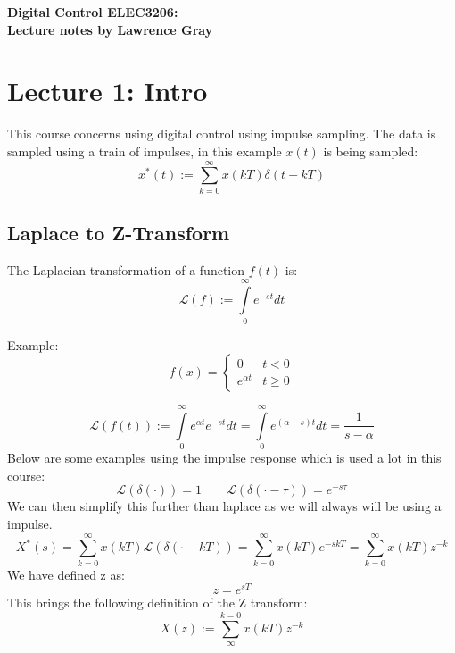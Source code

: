 \documentclass[a4paper,11pt]{article}
\begin{document}
  
\begin{center}

{\Large{\textbf{Digital Control ELEC3206:}}} \\ 
{\Large{\textbf{Lecture notes by Lawrence Gray}}} \\ [\baselineskip]
\end{center}
\section{Lecture 1: Intro }
	This course concerns using digital control using impulse sampling. The data is sampled using a train of impulses, in this example $x(t)$ is being sampled:
\begin{equation}
	x^*(t):= \sum\limits_{k=0}^{\infty}x(kT)\delta(t-kT)
	\end{equation}
	\subsection{Laplace to Z-Transform}
		The Laplacian transformation of a function $f(t)$ is:\\
		\begin{equation}
		\mathcal{L}(f):= \int\limits_{0}^{\infty}e^{-st}dt
		\end{equation}

		Example:\\
		
		\[ f(x) =\begin{cases} 
      			0 & t < 0\\
      			e^{\alpha t}& t \geq 0
   			\end{cases}
			\]

		\begin{equation}
		\mathcal{L}(f(t)):= \int\limits_{0}^{\infty}e^{\alpha t}e^{-st}dt =\int\limits_{0}^{\infty}e^{(\alpha -s)t}dt= \frac{1}{s-\alpha}		\end{equation}
		Below are some examples using the impulse response which is used a lot in this course:
		\begin{equation}
		    \mathcal{L}(\delta(\cdot))=1
		    \qquad
		    \mathcal{L}(\delta(\cdot-\tau))=e^{-s \tau}
		\end{equation}
		We can then simplify this further than laplace as we will always will be using a impulse.
		\begin{equation}
		    X^*(s)=\sum\limits_{k=0}^{\infty} x(kT)\mathcal{L}(\delta(\cdot-kT)) = \sum\limits_{k=0}^{\infty}x(kT)e^{-skT}= \sum\limits_{k=0}^{\infty}x(kT)z^{-k}
		\end{equation}
		We have defined z as:
		\begin{equation}
		    z=e^{sT}
		\end{equation}
		This brings the following definition of the Z transform:
		\begin{equation}
		    X(z):= \sum\limits_{\infty}^{k=0}x(kT)z^{-k}	
		\end{equation}		
\newpage
\end{document}
